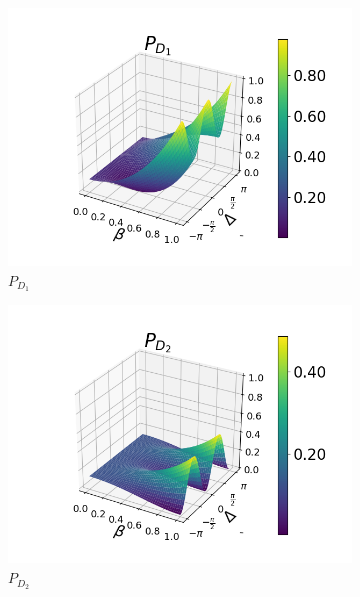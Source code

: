 \documentclass[12pt]{book}
\begin{document}
\begin{figure}[H]
\centering
\begin{subfigure}[b]{0.3\linewidth}
\includegraphics[width=\linewidth]{images/pd1_3_pi4.png}
\caption{$P_{D_{1}}$}
\end{subfigure}
\begin{subfigure}[b]{0.3\linewidth}
\includegraphics[width=\linewidth]{images/pd2_3_pi4.png}
\caption{$P_{D_{2}}$ }
\label{fig:BS1}
\end{subfigure}
\begin{subfigure}[b]{0.3\linewidth}

\end{subfigure}
\end{figure}
\end{document}
